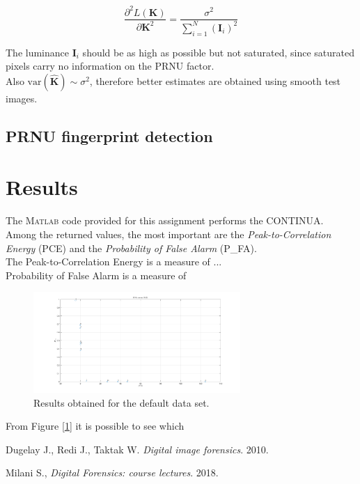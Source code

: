 \documentclass[a4paper, 12pt]{article}
\begin{document}
\begin{equation}
\dfrac{ \partial^2 L(\mathbf{K})}{\partial \mathbf{K}^2} = \dfrac{\sigma^2}{\sum\limits_{i=1}^{N} \left( \mathbf{I}_i \right) ^2}
\end{equation}

The luminance $\mathbf{I}_i$ should be as high as possible but not saturated, since saturated pixels carry no information on the PRNU factor.\\
Also $\text{var}(\mathbf{\hat{K}}) \sim \sigma^2$, therefore better estimates are obtained using smooth test images.

\subsection*{PRNU fingerprint detection}

\section*{Results}

The \textsc{Matlab} code provided for this assignment performs the CONTINUA.\\
Among the returned values, the most important are the \textit{Peak-to-Correlation Energy} (PCE) and the \textit{Probability of False Alarm} (P\_FA).\\
The Peak-to-Correlation Energy is a measure of ...\\
Probability of False Alarm is a measure of 


\begin{figure}[H]
	\centering
	\includegraphics[width=0.7\textwidth]{defaultdataset}
	\caption{Results obtained for the default data set.}
	\label{fig:defaultdataset}
\end{figure}

From Figure [\ref{fig:defaultdataset}] it is possible to see which

\begin{thebibliography}{3}
	Dugelay J., Redi J., Taktak W.
	\textit{Digital image forensics}.
	2010.
	
	Milani S.,
	\textit{Digital Forensics: course lectures}.
	2018.
\end{thebibliography}
\end{document}
